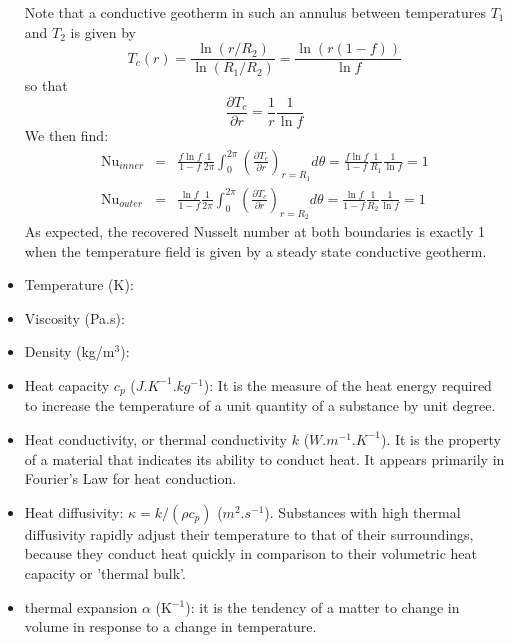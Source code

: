 \begin{itemize}
Note that a conductive geotherm in such an annulus between temperatures $T_1$ and $T_2$ is given by 
\[
T_c(r)=\frac{\ln (r/R_2)}{\ln(R_1/R_2)} = \frac{\ln(r(1-f))}{\ln f}
\]
so that 
\[
\frac{\partial T_c}{\partial r} = \frac{1}{r}\frac{1}{\ln f} 
\]
We then find:
\begin{eqnarray}
\text{Nu}_{inner} 
&=& \frac{f \ln f}{1-f} \frac{1}{2\pi} \int_0^{2\pi} \left( \frac{\partial T_c}{\partial r} \right)_{r=R_1} d\theta
= \frac{f \ln f}{1-f} \frac{1}{R_1}\frac{1}{\ln f} 
= 1 \\
\text{Nu}_{outer} 
&=& \frac{\ln f}{1-f} \frac{1}{2\pi} \int_0^{2\pi} \left( \frac{\partial T_c}{\partial r} \right)_{r=R_2} d\theta 
= \frac{\ln f}{1-f} \frac{1}{R_2}\frac{1}{\ln f} = 1 
\end{eqnarray}
As expected, the recovered Nusselt number at both boundaries is exactly 1 when the temperature field is
given by a steady state conductive geotherm.


 
\item Temperature (K):
\item Viscosity (Pa.s):
\item Density (kg/m$^3$):
\item Heat capacity $c_p$ ($J.K^{-1}.kg^{-1}$): It is the measure of the heat energy required to increase the 
temperature of a unit quantity of a substance by unit degree.
\item Heat conductivity, or thermal conductivity $k$ ($W.m^{-1}.K^{-1}$). It is the property of a material that indicates its ability to conduct     heat. It appears primarily in Fourier's Law for heat conduction.
\item Heat diffusivity: $\kappa=k/(\rho c_p)$ ($m^2.s^{-1}$). Substances with high thermal diffusivity rapidly adjust their temperature to that of their surroundings, because they 
conduct heat quickly in comparison to their volumetric heat capacity or 'thermal bulk'.
\item thermal expansion $\alpha$ (K$^{-1}$): it is the tendency of a matter to change in volume in response to a change in
temperature.

\end{itemize}





